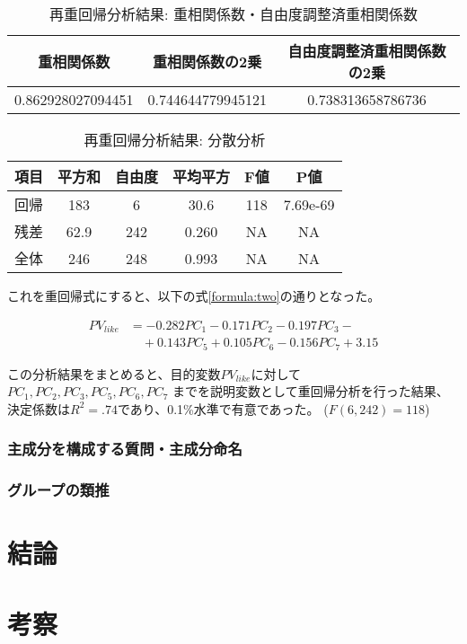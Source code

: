 \documentclass[11pt,a4paper, uplatex]{jsarticle}
\begin{document}
\begin{table}[htbp]
  \begin{center}
    \caption{再重回帰分析結果: 重相関係数・自由度調整済重相関係数}
    \begin{tabular}{c|c|c}
      \hline
      重相関係数 & 重相関係数の2乗 & 自由度調整済重相関係数の2乗 \\ \hline \hline
      0.862928027094451 & 0.744644779945121 & 0.738313658786736
    \end{tabular}
    \label{Rs-new}
  \end{center}
\end{table}

\begin{table}[htbp]
  \begin{center}
    \caption{再重回帰分析結果: 分散分析}
    \begin{tabular}{c|c|c|c|c|c}
      \hline
      項目 & 平方和 & 自由度 & 平均平方 & F値 & P値 \\ \hline \hline
      回帰 & 183 & 6 & 30.6 & 118 & 7.69e-69 \\
      残差 & 62.9 & 242 & 0.260 & NA & NA \\
      全体 & 246 & 248 & 0.993 & NA & NA \\
    \end{tabular}
    \label{annova-new}
  \end{center}
\end{table}

これを重回帰式にすると、以下の式\ref{formula:two}の通りとなった。

\begin{equation}
  \label{formula:two}
  \begin{split}
    PV_{like} &= -0.282PC_1 - 0.171PC_2 - 0.197PC_3 - \\
    &\quad + 0.143PC_5 + 0.105PC_6 - 0.156PC_7 + 3.15
  \end{split}
\end{equation}

この分析結果をまとめると、目的変数$ PV_{like} $に対して
$ PC_1, PC_2, PC_3, PC_5, PC_6, PC_7$
までを説明変数として重回帰分析を行った結果、
決定係数は$ R^2 = .74 $であり、0.1\%水準で有意であった。
($ F(6, 242) = 118 $)

\subsubsection{主成分を構成する質問・主成分命名}
\subsubsection{グループの類推}


\section{結論}
\section{考察}
\end{document}
